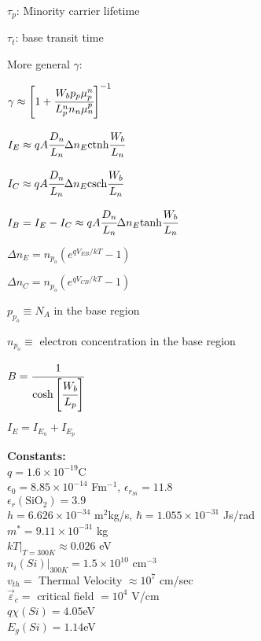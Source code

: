 \documentclass{article}
\newcommand{\sect}[1]{\noindent\textbf{#1}\\}
\newcommand\tab[1][1cm]{\hspace*{#1}}
\begin{document}
{\begin{multicols*}{2}
		\noindent $\tau_p$: Minority carrier lifetime
		
		\noindent $\tau_t$: base transit time
		
		\noindent More general $\gamma$:
		
		$\gamma \approx \left[ 1 + \cfrac{W_bp_p\mu_p^n}{L_p^nn_n\mu_n^p} \right]^{-1}$
		
		\noindent $I_E \approx qA\cfrac{D_n}{L_n}\Delta n_E \text{ctnh} \cfrac{W_b}{L_n}$
		
		\noindent $I_C \approx qA\cfrac{D_n}{L_n}\Delta n_E \text{csch} \cfrac{W_b}{L_n}$
		
		\noindent $I_B = I_E - I_C \approx qA\cfrac{D_n}{L_n}\Delta n_E \text{tanh} \cfrac{W_b}{L_n}$
		
		\noindent $\Delta n_E = n_{p_o} \left(e^{qV_{EB}/kT}-1\right)$
		
		\noindent $\Delta n_C = n_{p_o} \left(e^{qV_{CB}/kT}-1\right)$
		
		\noindent $p_{p_o} \equiv N_A$ in the base region 
		
		\noindent $n_{p_o} \equiv$ electron concentration in the base region 
		
		\noindent $B = \cfrac{1}{\cosh\left[\cfrac{W_b}{L_p}\right]}$
		
		\noindent $I_E = I_{E_n} + I_{E_p}$ \\
		
		\vfill\null
		\columnbreak
		
		\sect{Constants:}
		$q = 1.6\times10^{-19}$C\\
		$\epsilon_0 = 8.85\times10^{-14}$ Fm$^{-1}$,  $\epsilon_{r_{Si}} = 11.8$\\
		$ \epsilon_r(\text{SiO}_2) = 3.9 $ \\
		$h = 6.626 \times 10^{-34}$ m$^2$kg/s, \tab[0.25cm] $\hbar = 1.055 \times 10^{-31} $ Js/rad\\ 
		$m^* = 9.11 \times 10^{-31}$ kg\\
		$kT|_{T=300K} \approx 0.026$ eV \\
		$n_i(Si)|_{300K} = 1.5 \times 10^{10}$ cm$^{-3}$\\
		$v_{th} =$ Thermal Velocity $\approx 10^7$ cm/sec \\
		$\vec{\varepsilon}_c =$ critical field $= 10^4$ V/cm \\
		$q\chi(Si) = 4.05$eV\\
		$E_g(Si) = 1.14$eV
		
		
	\end{multicols*}
	
	}
\end{document}
